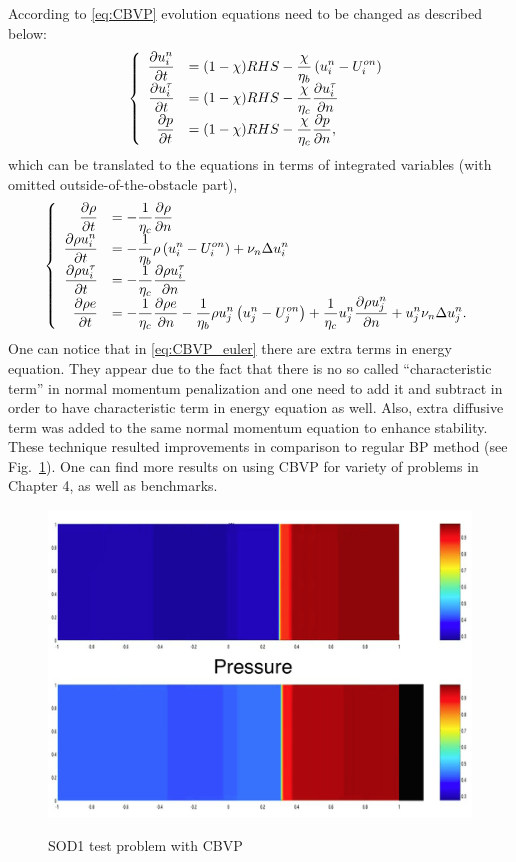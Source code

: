 According to \eqref{eq:CBVP} evolution equations need to be changed as described below:
\begin{align*}
\left\{\begin{array}{rl}
\displaystyle \frac {\partial u_i^n }{\partial t} & = \displaystyle (1-\chi)RHS - \frac \chi {\eta_b} \left(u_i^n - U_i^{on}\right) \\
\displaystyle \frac {\partial u_i^\tau}{\partial t} & = \displaystyle (1-\chi) RHS - \frac \chi {\eta_c} \frac {\partial u_i^\tau}{\partial n} \\
\displaystyle \frac {\partial p}{\partial t} & = \displaystyle (1-\chi) RHS - \frac \chi {\eta_c} \frac {\partial p}{\partial n},
\end{array}\right.
\end{align*}
which can be translated to the equations in terms of integrated variables (with omitted outside-of-the-obstacle part),
\begin{align}
\left\{\begin{array}{rl}
\displaystyle \frac {\partial \rho}{\partial t} & = \displaystyle -\frac 1 {\eta_c} \frac {\partial \rho}{\partial n} \\ [1ex]
\displaystyle \frac {\partial \rho u_i^n}{\partial t} & = \displaystyle -\frac 1{\eta_b} \rho \left(u_i^n - U_i^{on}\right) + \nu_n \Delta u_i^n \\ [1ex]
\displaystyle \frac {\partial \rho u_i^\tau}{\partial t} & = \displaystyle -\frac 1{\eta_c} \frac {\partial \rho u_i^\tau}{\partial n} \\ [1ex]
\displaystyle \frac {\partial \rho e}{\partial t} & = \displaystyle -\frac 1{\eta_c} \frac {\partial \rho e}{\partial n} - \frac 1{\eta_b}\rho u_j^n \left(u_j^n - U_j^{on}\right) + \frac 1{\eta_c} u_j^n \frac {\partial \rho u_j^n}{\partial n} + u_j^n \nu_n \Delta u_j^n.
\end{array}\right. \label{eq:CBVP_euler}
\end{align}
One can notice that in \eqref{eq:CBVP_euler} there are extra terms in energy equation. They appear due to the fact that there is no so called ``characteristic term'' in normal momentum penalization and one need to add it and subtract in order to have characteristic term in energy equation as well. Also, extra diffusive term was added to the same normal momentum equation to enhance stability. These technique resulted improvements in comparison to regular BP method (see Fig.~\ref{fig:sod_cbvp}). One can find more results on using CBVP for variety of problems in Chapter 4, as well as benchmarks.
\begin{figure}[h!]
\centering \includegraphics[scale=0.3]{fig/sod1_cbvp.png}\\
\caption{SOD1 test problem with CBVP \label{fig:sod_cbvp}}
\end{figure}







